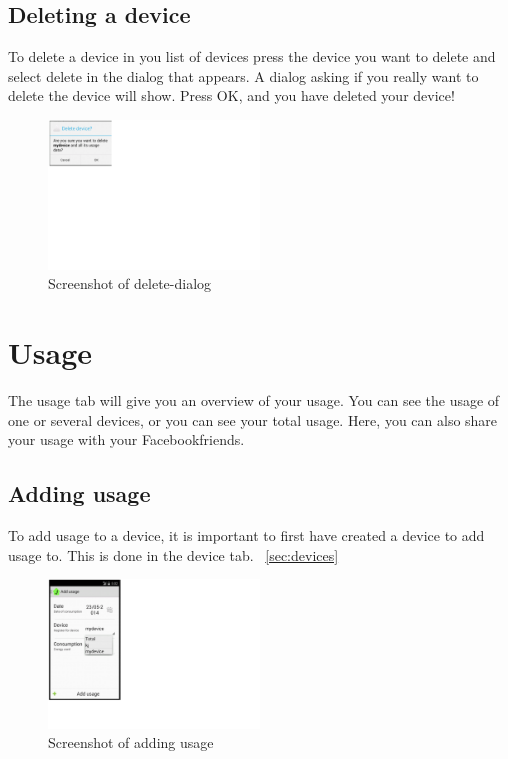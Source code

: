 \subsection{Deleting a device}
To delete a device in you list of devices press the device you want to delete and select delete in the dialog that appears. A dialog asking if you really want to delete the device will show. Press OK, and you have deleted your device!

\begin{figure}[H]
\centering
\includegraphics[width=0.5\textwidth, clip, trim=0cm 14cm 20cm 0cm]{appendix/usermanual/fig/ReallyDeleteDevice.png}
\caption{Screenshot of delete-dialog}
\end{figure}

\section{Usage}
The usage tab will give you an overview of your usage. You can see the usage of one or several devices, or you can see your total usage. Here, you can also share your usage with your Facebookfriends.
\subsection{Adding usage}
To add usage to a device, it is important to first have created a device to add usage to. This is done in the device tab. ~\ref{sec:devices}

\begin{figure}[H]
\centering
\includegraphics[width=0.5\textwidth, clip, trim=0cm 4cm 19.5cm 0cm]{appendix/usermanual/fig/AddUsage.png}
\caption{Screenshot of adding usage}
\end{figure}

